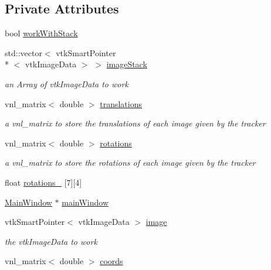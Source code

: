 \subsection*{Private Attributes}
\begin{DoxyCompactItemize}
\item 
bool \hyperlink{class_probe_calibration_widget_a15fe2768facb79d700b4481479e56ad0}{work\-With\-Stack}
\item 
std\-::vector$<$ vtk\-Smart\-Pointer\\*
$<$ vtk\-Image\-Data $>$ $>$ \hyperlink{class_probe_calibration_widget_adf05803fc62518128463039d5b46ac28}{image\-Stack}
\begin{DoxyCompactList}\small\item\em an Array of vtk\-Image\-Data to work \end{DoxyCompactList}\item 
vnl\-\_\-matrix$<$ double $>$ \hyperlink{class_probe_calibration_widget_a7d65e018cd29fd62b2d9b1aca19e3276}{translations}
\begin{DoxyCompactList}\small\item\em a vnl\-\_\-matrix to store the translations of each image given by the tracker \end{DoxyCompactList}\item 
vnl\-\_\-matrix$<$ double $>$ \hyperlink{class_probe_calibration_widget_ac723f22e498e6c58360a021302caf723}{rotations}
\begin{DoxyCompactList}\small\item\em a vnl\-\_\-matrix to store the rotations of each image given by the tracker \end{DoxyCompactList}\item 
float \hyperlink{class_probe_calibration_widget_ad73b59c52447ede4f5976f05741bc16a}{rotations\-\_} \mbox{[}7\mbox{]}\mbox{[}4\mbox{]}
\item 
\hyperlink{class_main_window}{Main\-Window} $\ast$ \hyperlink{class_probe_calibration_widget_aee1fb564f8f3e03cd8d932cabe6716b4}{main\-Window}
\item 
vtk\-Smart\-Pointer$<$ vtk\-Image\-Data $>$ \hyperlink{class_probe_calibration_widget_a5f639b7a6f3c520427f245e44c51c962}{image}
\begin{DoxyCompactList}\small\item\em the vtk\-Image\-Data to work \end{DoxyCompactList}\item 
vnl\-\_\-matrix$<$ double $>$ \hyperlink{class_probe_calibration_widget_a38ce67d5acddadf91da9b7cf64cbbc30}{coords}

\end{DoxyCompactItemize}

